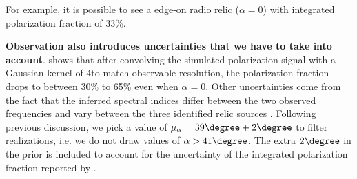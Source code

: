 For example, it is possible to see a edge-on radio relic ($\alpha = 0$) with integrated polarization fraction of 33\%. 
\par 

%
\textbf{Observation also introduces uncertainties that we have to take into account}. \cite{S13} shows that after convolving the
simulated polarization signal with a Gaussian kernel of 4\arcmin to match
observable resolution, the polarization fraction drops to between 30\% to
65\% even when $\alpha = 0$. 
Other uncertainties come from the fact that the inferred spectral indices
differ between the two observed frequencies and vary between the three
identified relic sources \citep{L13}. 
Following previous discussion, we pick a value of $\mu_\alpha =39\degree +
2 \degree$ to filter realizations, i.e. we do not draw values of $\alpha >
41\degree$. The extra $2 \degree$ in the prior is included to account for the uncertainty of the integrated polarization fraction reported by \cite{L13}. 

